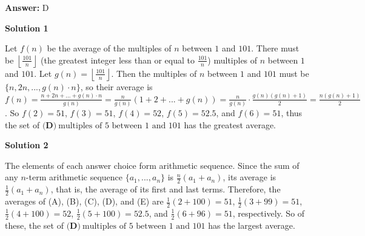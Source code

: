 \begin{enumerate}
 \textbf{Answer: }D



\textbf{Solution 1}

Let $f(n)$ be the average of the multiples of $n$ between $1$ and $101$.  There must be $\left\lfloor \frac{101}{n} \right\rfloor$ (the greatest integer less than or equal to $\frac{101}{n}$) multiples of $n$ between $1$ and $101$.  Let $g(n) = \left\lfloor \frac{101}{n} \right\rfloor$.  Then the multiples of $n$ between $1$ and $101$ must be $\{n, 2n, ..., g(n) \cdot n\}$, so their average is $f(n)=\frac{n + 2n + ... + g(n) \cdot n}{g(n)} = \frac{n}{g(n)} (1 + 2 + ... + g(n)) = \frac{n}{g(n)} \cdot \frac{g(n)(g(n)+1)}{2} = \frac{n(g(n)+1)}{2}$.  So $f(2) = 51$, $f(3) = 51$, $f(4) = 52$, $f(5) = 52.5$, and $f(6) = 51$, thus the set of $\boxed{\textbf{(D)}\ \text{multiples of 5 between 1 and 101}}$ has the greatest average.

 



\textbf{Solution 2}

The elements of each answer choice form arithmetic sequence. Since the sum of any $n$-term arithmetic sequence $\{a_1, ..., a_n\}$ is $\frac{n}{2}(a_1+a_n)$, its average is $\frac{1}{2}(a_1+a_n)$, that is, the average of its first and last terms.  Therefore, the averages of (A), (B), (C), (D), and (E) are $\frac{1}{2}(2+100) = 51$, $\frac{1}{2}(3+99) = 51$, $\frac{1}{2}(4+100) = 52$, $\frac{1}{2}(5+100) = 52.5$, and $\frac{1}{2}(6+96) = 51$, respectively. So of these, the set of $\boxed{\textbf{(D)}\ \text{multiples of 5 between 1 and 101}}$ has the largest average.

 


\end{enumerate}